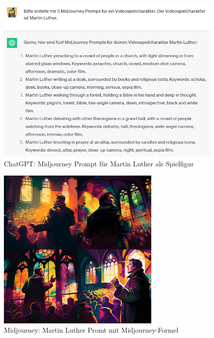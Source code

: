 \documentclass[10pt,a4paper,bibliography=totocnumbered,listof=totocnumbered]{scrartcl}
\begin{document}
\begin{figure}
	\centering
	\includegraphics[scale=0.7]{BilderFuerBA/CGPTMidJourneyMartinLuther/07.png}
	\caption{ChatGPT: Midjourney Prompt für Martin Luther als Spielfigur}
	\label{chatgptMartinLutherMJformelErstenFünf}
\end{figure}


\begin{figure}
	\centering
	\includegraphics[width=8.022cm]{BilderFuerBA/MJ/MidJourneyMLMitFormel.png}
	\caption{Midjourney: Martin Luther Promt mit Midjourney-Formel}
	\label{MidJourneyMLMitFormel}
\end{figure}
\end{document}
